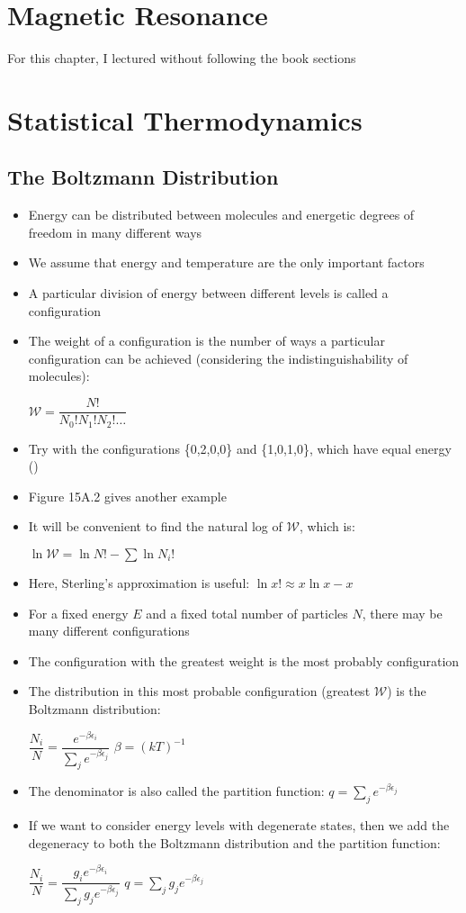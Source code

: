 \documentclass[12pt, openany, letterpaper]{memoir}
\begin{document}
\chapter{Magnetic Resonance}
For this chapter, I lectured without following the book sections

\chapter{Statistical Thermodynamics}
\section{The Boltzmann Distribution}
\begin{itemize}
	\item Energy can be distributed between molecules and energetic degrees of freedom in many different ways
	\item We assume that energy and temperature are the only important factors
	\item A particular division of energy between different levels is called a configuration
	\item The weight of a configuration is the number of ways a particular configuration can be achieved (considering the indistinguishability of molecules): 
	
	$\mathcal{W} = \dfrac{N!}{N_0!N_1!N_2!\ldots}$
	\item Try with the configurations \{0,2,0,0\} and \{1,0,1,0\}, which have equal energy ()
	\item Figure 15A.2 gives another example
	\item It will be convenient to find the natural log of $\mathcal{W}$, which is:
	
	$\ln\mathcal{W} = \ln N! - \sum \ln N_i!$
	\item Here, Sterling's approximation is useful: $\ln x! \approx x\ln x - x$
	\item For a fixed energy $E$ and a fixed total number of particles $N$, there may be many different configurations
	\item The configuration with the greatest weight is the most probably configuration
	\item The distribution in this most probable configuration (greatest $\mathcal{W}$) is the Boltzmann distribution:
	
	$\dfrac{N_i}{N}=\dfrac{e^{-\beta \epsilon_i}}{\displaystyle\sum\limits_j e^{-\beta \epsilon_j}}$ \hspace{2em} $\beta = \left(kT\right)^{-1}$
	\item The denominator is also called the partition function: $q = \displaystyle\sum\limits_j e^{-\beta \epsilon_j}$
	\item If we want to consider energy levels with degenerate states, then we add the degeneracy to both the Boltzmann distribution and the partition function:
	
	$\dfrac{N_i}{N}=\dfrac{g_ie^{-\beta \epsilon_i}}{\displaystyle\sum\limits_j g_je^{-\beta \epsilon_j}}$ \hspace{2em}  $q = \displaystyle\sum\limits_j g_je^{-\beta \epsilon_j}$	
\end{itemize}
\end{document}
